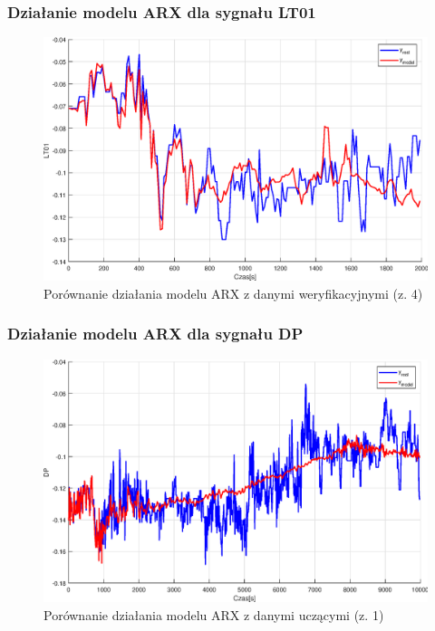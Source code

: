 \addtocounter{framenumber}{-1}
\begin{frame}
  \frametitle{Działanie modelu ARX dla sygnału LT01}
  \begin{figure}[H]
    \centering
    \includegraphics[width=0.75\linewidth,keepaspectratio]{results_matlab/LT01_4.eps}
    \caption{Porównanie działania modelu ARX z danymi weryfikacyjnymi (z. 4)}
    \label{fig:test}
    \end{figure}
\end{frame}

\begin{frame}
  \frametitle{Działanie modelu ARX dla sygnału DP}
  \begin{figure}[H]
    \centering
    \includegraphics[width=0.75\linewidth,keepaspectratio]{results_matlab/DP_1.eps}
    \caption{Porównanie działania modelu ARX z danymi uczącymi (z. 1)}
    \label{fig:test}
    \end{figure}
\end{frame}


